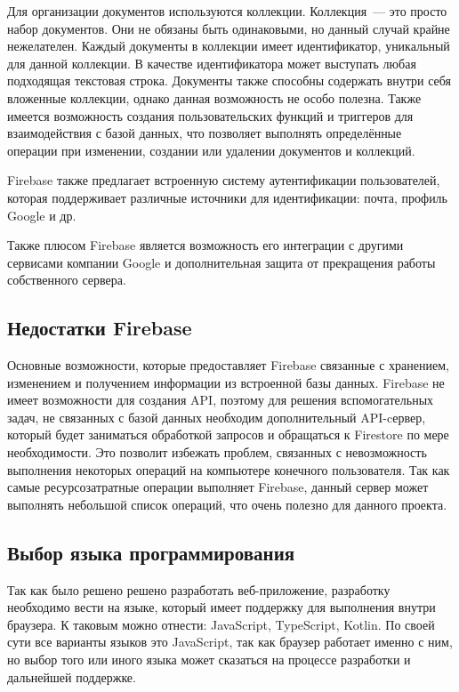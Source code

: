 Для организации документов используются коллекции. Коллекция~--- это просто набор документов. Они не обязаны быть одинаковыми, но данный случай крайне нежелателен. Каждый документы в коллекции имеет идентификатор, уникальный для данной коллекции. В качестве идентификатора может выступать любая подходящая текстовая строка. Документы также способны содержать внутри себя вложенные коллекции, однако данная возможность не особо полезна. Также имеется возможность создания пользовательских функций и триггеров для взаимодействия с базой данных, что позволяет выполнять определённые операции при изменении, создании или удалении документов и коллекций. 

Firebase также предлагает встроенную систему аутентификации пользователей, которая поддерживает различные источники для идентификации: почта, профиль Google и др.

Также плюсом Firebase является возможность его интеграции с другими сервисами компании Google и дополнительная защита от прекращения работы собственного сервера.

\subsection{Недостатки Firebase}
Основные возможности, которые предоставляет Firebase связанные с хранением, изменением и получением информации из встроенной базы данных. Firebase не имеет возможности для создания API, поэтому для решения вспомогательных задач, не связанных с базой данных необходим дополнительный API-cервер, который будет заниматься обработкой запросов и обращаться к Firestore по мере необходимости. Это позволит избежать проблем, связанных с невозможность выполнения некоторых операций на компьютере конечного пользователя. Так как самые ресурсозатратные операции выполняет Firebase, данный сервер может выполнять небольшой список операций, что очень полезно для данного проекта.
 
\subsection{Выбор языка программирования}
Так как было решено решено разработать веб-приложение, разработку необходимо вести на языке, который имеет поддержку для выполнения внутри браузера. К таковым можно отнести: JavaScript, TypeScript, Kotlin. По своей сути все варианты языков это JavaScript, так как браузер работает именно с ним, но выбор того или иного языка может сказаться на процессе разработки и дальнейшей поддержке.
 
